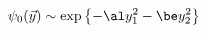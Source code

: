 \begin{equation}
\label{YWAV}
\psi_0(\vec{y}) \sim 
\exp{\left\{-\al y^{2}_{1} -\be y^{2}_{2} \right\} } 
\end{equation} 
